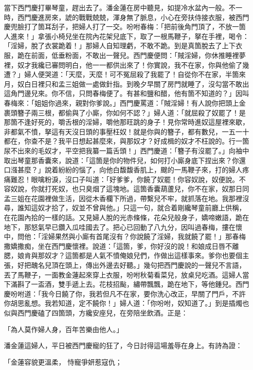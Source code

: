 \begin{showcontents}{}
當下西門慶打畢琴童，趕出去了。潘金蓮在房中聽見，如提冷水盆內一般。不一時，西門慶進房來，諕的戰戰兢兢，渾身無了脈息，小心在旁扶侍接衣服，被西門慶兜臉打了箇耳刮子，把婦人打了一交。吩咐春梅：「把前後角門頂了，不放一箇人進來！」拿張小椅兒坐在院內花架兒底下，取了一根馬鞭子，拏在手裡，喝令：「淫婦，脫了衣裳跪着！」那婦人自知理虧，不敢不跪。到是真箇脫去了上下衣服，跪在前面，低垂粉面，不敢出一聲兒。西門慶便問：「賊淫婦，你休推睡裡夢裡，奴才我纔已審問明白，他一一都供出來了！你實說，我不在家，你與他偷了幾遭？」婦人便哭道：「天麼，天麼！可不冤屈殺了我罷了！自從你不在家，半箇來月，奴白日裡只和孟三姐做一處做針指。到晚夕早關了房門就睡了，沒勾當不敢出這角門邊兒來。你不信，只問春梅便了。有甚和鹽和醋，他有箇不知道的？」因叫春梅來：「姐姐你過來，親對你爹說。」西門慶罵道：「賊淫婦！有人說你把頭上金裹頭簪子兩三根，都偷與了小廝，你如何不認？」婦人道：「就屈殺了奴罷了！是那箇不逢好死的，嚼舌根的淫婦，嚼他那旺跳的身子！見你常時進奴這屋裡來歇，非都氣不憤，拏這有天沒日頭的事壓枉奴！就是你與的簪子，都有數兒，一五一十都在，你查不是？我平日想起甚麼來，與那奴才？好成楫的奴才不枉說的。行一箇尿不出來的毛奴才，平空把我纂一篇舌頭！」西門慶道：「簪子有沒罷了。」向袖中取出琴童那香囊來，說道：「這箇是你的物件兒，如何打小廝身底下捏出來？你還口漒甚麼？」說着紛紛的惱了，向他白馥馥香肌上，颼的一馬鞭子來，打的婦人疼痛難忍！眼噙粉淚，沒口子叫道：「好爹爹，你饒了奴罷！你容奴說，奴便說。不容奴說，你就打死奴，也只臭烟了這塊地。這箇香囊葫蘆兒，你不在家，奴那日同孟三姐在花園裡做生活，因從木香欄下所過，帶繫兒不牢，就抓落在地。我那裡沒尋，誰知這奴才拾了，奴並不曾與他。」只這一句，就合着剛纔琴童前廳上供稱，在花園內拾的一樣的話。又見婦人脫的光赤條條，花朵兒般身子，嬌啼嫩語，跪在地下，那怒氣早已鑽入瓜哇國去了。把心已回動了八九分，因叫過春梅，摟在懷中，問他：「淫婦果然與小廝有首尾沒有？你說饒了淫婦，我就饒了罷！」那春梅撒嬌撒痴，坐在西門慶懷裡。說道：「這箇，爹，你好沒的說！和娘成日唇不離腮，娘肯與那奴才？這箇都是人氣不憤俺娘兒們，作做出這樣事來。爹你也要個主張，好把醜名兒頂在頭上，傳出外邊去好聽。」幾句把西門慶說的一聲兒不言語，丟了馬鞭子，一面教金蓮起來穿上衣服，吩咐秋菊看菜兒，放桌兒吃酒。這婦人當下滿斟了一盃酒，雙手遞上去。花枝招颭，繡帶飄飄，跪在地下，等他鍾兒。西門慶吩咐道：「我今日饒了你，我若但凡不在家，要你洗心改正，早關了門戶，不許你胡思亂想。我若知道，定不饒你！」婦人道：「你吩咐，奴知道了。」到是插燭也似與西門慶磕了四箇頭，方纔安座兒，在旁陪坐飲酒。正是：

「為人莫作婦人身，百年苦樂由他人。」

潘金蓮這婦人，平日被西門慶寵的狂了，今日討得這場羞辱在身上。有詩為證：

「金蓮容貌更溫柔，  恃寵爭妍惹寇仇；


\end{showcontents}
